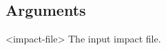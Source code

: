 \subsection{Arguments}\label{scenarioAggrExecutable_scenarioAggrArguments}
\begin{unknownListing}
     <impact-file>
     The input impact file.
\end{unknownListing}

%
%
